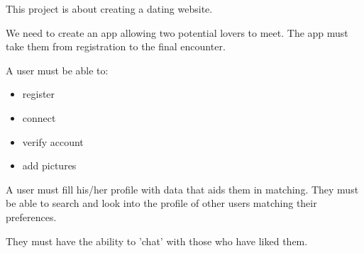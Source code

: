 This project is about creating a dating website.

We need to create an app allowing two potential lovers
to meet. The app must take them from registration to the
final encounter.

A user must be able to:
\begin{itemize}
    \item register
    \item connect
    \item verify account
    \item add pictures
\end{itemize}
A user must fill his/her profile with data that aids them in matching.
They must be able to search and look into the profile of other users
matching their preferences.

They must have the ability to 'chat' with those who have liked them.


